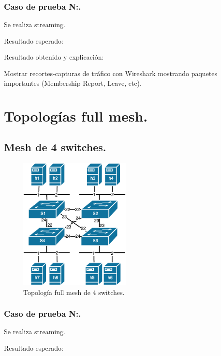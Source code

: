 \documentclass[12pt,a4paper,oneside]{book}
\begin{document}
\subsubsection{Caso de prueba N:.} 
Se realiza streaming.

\vspace{0.5cm}
Resultado esperado: 

\vspace{0.5cm}
Resultado obtenido y explicación: 

\vspace{0.5cm}
Mostrar recortes-capturas de tráfico con Wireshark mostrando paquetes importantes (Membership Report, Leave, etc).


\section{Topologías full mesh.}

\subsection{Mesh de 4 switches.}

\begin{figure}[ht]
 \centering
 \includegraphics[width=0.5\textwidth]{fotos/5_Pruebas/4_topo_mesh/mesh_simple.png}
 \caption{Topología full mesh de 4 switches.}
 \label{mesh_simple}
\end{figure}

\subsubsection{Caso de prueba N:.} 
Se realiza streaming.

\vspace{0.5cm}
Resultado esperado: 
\end{document}
